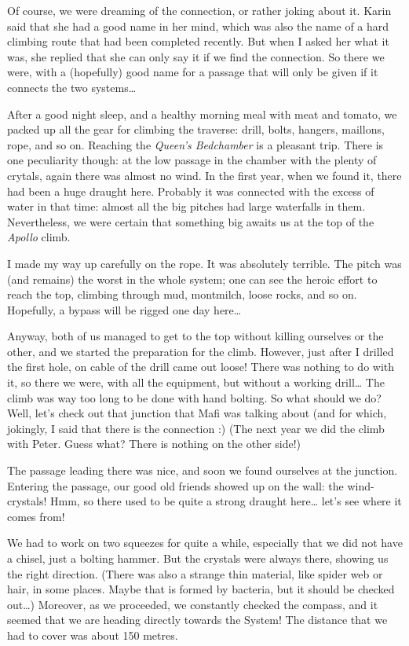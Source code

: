 Of course, we were dreaming of the connection, or rather joking about
it. Karin said that she had a good name in her mind, which was also the
name of a hard climbing route that had been completed recently. But when
I asked her what it was, she replied that she can only say it if we find
the connection. So there we were, with a (hopefully) good name for a
passage that will only be given if it connects the two systems\ldots{}

After a good night sleep, and a healthy morning meal with meat and
tomato, we packed up all the gear for climbing the traverse: drill,
bolts, hangers, maillons, rope, and so on. Reaching the \emph{Queen's
Bedchamber} is a pleasant trip. There is one peculiarity though: at the
low passage in the chamber with the plenty of crytals, again there was
almost no wind. In the first year, when we found it, there had been a
huge draught here. Probably it was connected with the excess of water in
that time: almost all the big pitches had large waterfalls in them.
Nevertheless, we were certain that something big awaits us at the top of
the \emph{Apollo} climb.

I made my way up carefully on the rope. It was absolutely terrible. The
pitch was (and remains) the worst in the whole system; one can see the
heroic effort to reach the top, climbing through mud, montmilch, loose
rocks, and so on. Hopefully, a bypass will be rigged one day
here\ldots{}

Anyway, both of us managed to get to the top without killing ourselves
or the other, and we started the preparation for the climb. However,
just after I drilled the first hole, on cable of the drill came out
loose! There was nothing to do with it, so there we were, with all the
equipment, but without a working drill\ldots{} The climb was way too
long to be done with hand bolting. So what should we do? Well, let's
check out that junction that Mafi was talking about (and for which,
jokingly, I said that there is the connection :) (The next year we did
the climb with Peter. Guess what? There is nothing on the other side!)

The passage leading there was nice, and soon we found ourselves at the
junction. Entering the passage, our good old friends showed up on the
wall: the wind-crystals! Hmm, so there used to be quite a strong draught
here\ldots{} let's see where it comes from!

We had to work on two squeezes for quite a while, especially that we did
not have a chisel, just a bolting hammer. But the crystals were always
there, showing us the right direction. (There was also a strange thin
material, like spider web or hair, in some places. Maybe that is formed
by bacteria, but it should be checked out\ldots{}) Moreover, as we
proceeded, we constantly checked the compass, and it seemed that we are
heading directly towards the System! The distance that we had to cover
was about 150 metres.

